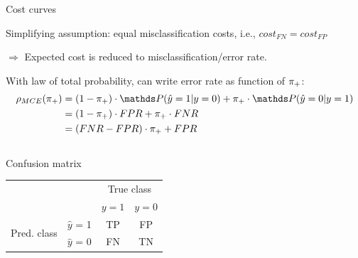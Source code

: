 \begin{vbframe}{Cost curves}
\small

Simplifying assumption: equal misclassification costs, i.e., $cost_{FN} = cost_{FP}$ 

$\Rightarrow$ Expected cost is reduced to misclassification/error rate.

With law of total probability, can write error rate as function of $\pi_{+}$:
\begin{align*}
\rho_{MCE}(\rp)
&= (1 - \rp) \cdot \P(\hat y = 1 | y = 0) + \rp \cdot \P(\hat y = 0 | y = 1) \\
&= (1 - \rp) \cdot FPR + \rp \cdot FNR \\
&= (FNR - FPR) \cdot \rp + FPR
\end{align*}

\begin{columns}[T]
\begin{column}{0.5\textwidth}

\centerline{Confusion matrix}
\begin{tabular}{cc|cc}
    & &\multicolumn{2}{c}{True class} \\
    & & $y=1$ & $y=0$  \\
 \hline
    \multirow{2}{*}{\parbox{0.3cm}{Pred.  class}}& $\hat y$ = 1     & TP                 & FP\\
    & $\hat y$ = 0 & FN              & TN\\
\end{tabular}
\end{column}


\end{columns}
\end{vbframe}
